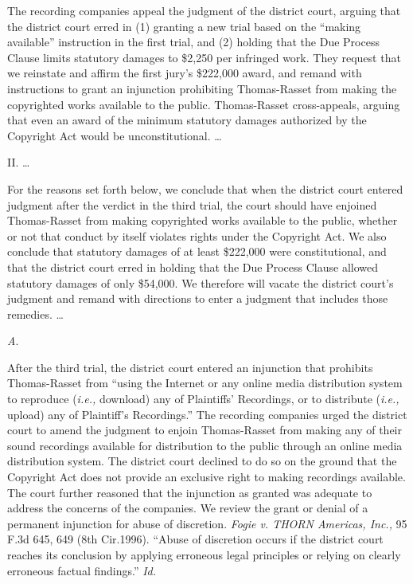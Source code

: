 The recording companies appeal the judgment of the district court, arguing that
the district court erred in (1) granting a new trial based on the ``making
available'' instruction in the first trial, and (2) holding that the Due
Process Clause limits statutory damages to \$2,250 per infringed work. They
request that we reinstate and affirm the first jury's \$222,000 award, and
remand with instructions to grant an injunction prohibiting Thomas-Rasset from
making the copyrighted works available to the public. Thomas-Rasset
cross-appeals, arguing that even an award of the minimum statutory damages
authorized by the Copyright Act would be unconstitutional. {\dots}

{\centering
II. {\dots}
\par}

For the reasons set forth below, we conclude that when the district court
entered judgment after the verdict in the third trial, the court should have
enjoined Thomas-Rasset from making copyrighted works available to the public,
whether or not that conduct by itself violates rights under the Copyright Act.
We also conclude that statutory damages of at least \$222,000 were
constitutional, and that the district court erred in holding that the Due
Process Clause allowed statutory damages of only \$54,000. We therefore will
vacate the district court's judgment and remand with directions to enter a
judgment that includes those remedies. {\dots}

{\centering
\textit{A}.
\par}

After the third trial, the district court entered an injunction that prohibits
Thomas-Rasset from ``using the Internet or any online media distribution system
to reproduce (\textit{i.e.,} download) any of Plaintiffs' Recordings, or to
distribute (\textit{i.e.,} upload) any of Plaintiff's Recordings.'' The
recording companies urged the district court to amend the judgment to enjoin
Thomas-Rasset from making any of their sound recordings available for
distribution to the public through an online media distribution system. The
district court declined to do so on the ground that the Copyright Act does not
provide an exclusive right to making recordings available. The court further
reasoned that the injunction as granted was adequate to address the concerns of
the companies. We review the grant or denial of a permanent injunction for
abuse of discretion. \textit{Fogie v. THORN Americas, Inc.,} 95 F.3d 645, 649
(8th Cir.1996). ``Abuse of discretion occurs if the district court reaches its
conclusion by applying erroneous legal principles or relying on clearly
erroneous factual findings.'' \textit{Id.}

